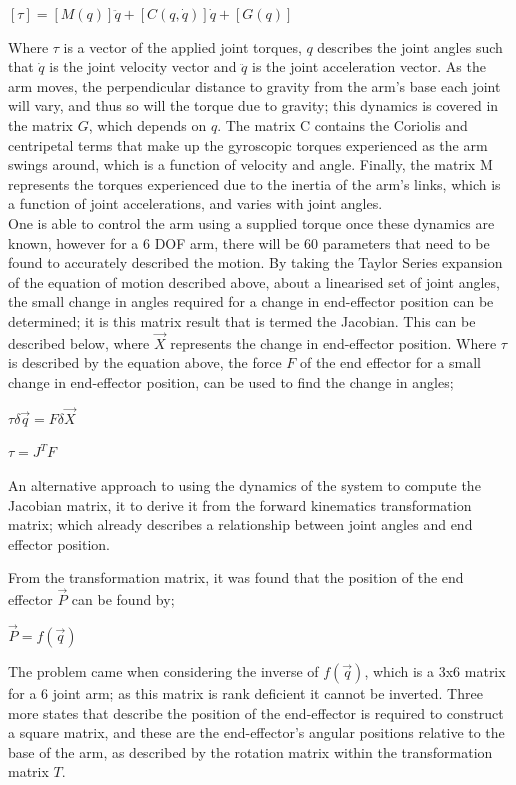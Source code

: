 \documentclass[12pt,openany,a4paper]{book}
\begin{document}
$[\tau] = [M(q)] \ddot{q} + [ C (q, \dot{q} ) ] \dot{q} + [G(q)]$

Where $\tau$ is a vector of the applied joint torques, $q$ describes the joint angles such that $\dot{q}$ is the joint velocity vector and $\ddot{q}$ is the joint acceleration vector. As the arm moves, the perpendicular distance to gravity from the arm's base each joint will vary, and thus so will the torque due to gravity; this dynamics is covered in the matrix $G$, which depends on $q$. The matrix C contains the Coriolis and centripetal terms that make up the gyroscopic torques experienced as the arm swings around, which is a function of velocity and angle. Finally, the matrix M represents the torques experienced due to the inertia of the arm's links, which is a function of joint accelerations, and varies with joint angles.\\
One is able to control the arm using a supplied torque once these dynamics are known, however for a 6 DOF arm, there will be 60 parameters that need to be found to accurately described the motion. By taking the Taylor Series expansion of the equation of motion described above, about a linearised set of joint angles, the small change in angles required for a change in end-effector position can be determined; it is this matrix result that is termed the Jacobian. This can be described below, where $\vec{X}$ represents the change in end-effector position. Where $\tau$ is described by the equation above, the force $F$ of the end effector for a small change in end-effector position, can be used to find the change in angles;

$\tau \delta \vec{q} = F \delta	\vec{X}$

$\tau = J^T F$

An alternative approach to using the dynamics of the system to compute the Jacobian matrix, it to derive it from the forward kinematics transformation matrix; which already describes a relationship between joint angles and end effector position. 

From the transformation matrix, it was found that the position of the end effector $\vec{P}$ can be found by;

$\vec{P} = f( \vec{q} )$

The problem came when considering the inverse of $f(\vec{q})$, which is a 3x6 matrix for a 6 joint arm; as this matrix is rank deficient it cannot be inverted. Three more states that describe the position of the end-effector is required to construct a square matrix, and these are the end-effector's angular positions relative to the base of the arm, as described by the rotation matrix within the transformation matrix $T$.
\end{document}
